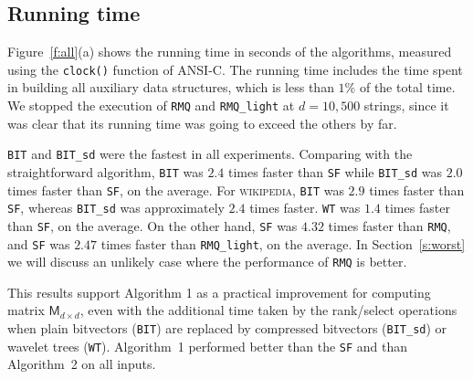 \documentclass{elsarticle}
\newcommand{\Md}{\ensuremath{\mathsf{M}}\xspace}
\newcommand{\st}{\texttt{SF}\xspace}
\newcommand{\bit}{\texttt{BIT}\xspace}
\newcommand{\bitsd}{\texttt{BIT\_sd}\xspace}
\newcommand{\wt}{\texttt{WT}\xspace}
\newcommand{\gog}{\texttt{RMQ\_light}\xspace}
\newcommand{\gognz}{\texttt{RMQ}\xspace}
\begin{document}
\subsection{Running time}

Figure~\ref{f:all}(a) shows the running time in seconds of the algorithms,
measured using the \texttt{clock()} function of ANSI-C.
The running time includes the time spent in building all auxiliary data
structures, which is less than $1\%$ of the total time.
We stopped the execution of \gognz and \gog at $d=10,500$ strings, since it
was clear that its running time was going to exceed the others by far.

\bit and \bitsd were the fastest in all experiments.  Comparing
with the straightforward algorithm, \bit was $2.4$ times faster than \st
while \bitsd was $2.0$ times faster than \st, on the average.
For \textsc{wikipedia}, \bit was $2.9$ times faster than \st, whereas \bitsd
was approximately $2.4$ times faster.
\wt was $1.4$ times faster than \st,
on the average.
On the other hand, \st was $4.32$ times faster than \gognz,
and \st was $2.47$ times faster than \gog, on the average.
In Section~\ref{s:worst} we will discuss an unlikely case where
the performance of \gognz is better.

This results support Algorithm 1 as a practical improvement for computing
matrix $\Md_{d\times d}$, even with the additional time taken by the
rank/select operations when plain bitvectors (\bit) are replaced by
compressed bitvectors (\bitsd) or wavelet trees (\wt).
Algorithm~1
performed better than the \st and than Algorithm~2 on
all inputs.
\end{document}
